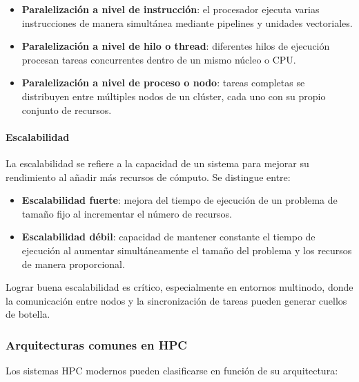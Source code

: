\begin{itemize}
    \item \textbf{Paralelización a nivel de instrucción}: el procesador ejecuta varias instrucciones de manera simultánea mediante pipelines y unidades vectoriales.
    \item \textbf{Paralelización a nivel de hilo o thread}: diferentes hilos de ejecución procesan tareas concurrentes dentro de un mismo núcleo o CPU.
    \item \textbf{Paralelización a nivel de proceso o nodo}: tareas completas se distribuyen entre múltiples nodos de un clúster, cada uno con su propio conjunto de recursos.
\end{itemize}
\paragraph{Escalabilidad}
La escalabilidad se refiere a la capacidad de un sistema para mejorar su rendimiento al añadir más recursos de cómputo. Se distingue entre:

\begin{itemize}
    \item \textbf{Escalabilidad fuerte}: mejora del tiempo de ejecución de un problema de tamaño fijo al incrementar el número de recursos.
    \item \textbf{Escalabilidad débil}: capacidad de mantener constante el tiempo de ejecución al aumentar simultáneamente el tamaño del problema y los recursos de manera proporcional.
\end{itemize}

Lograr buena escalabilidad es crítico, especialmente en entornos multinodo, donde la comunicación entre nodos y la sincronización de tareas pueden generar cuellos de botella.

\subsubsection{Arquitecturas comunes en HPC}

Los sistemas HPC modernos pueden clasificarse en función de su arquitectura:


